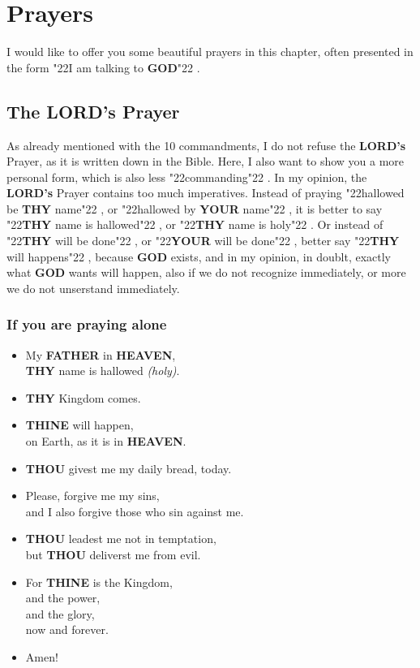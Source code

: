 \documentclass[12pt,a4paper]{article}
\newcommand{\God}[0]{\textbf{GOD}}
\newcommand{\Father}[0]{\textbf{FATHER}}
\newcommand{\Heaven}[0]{\textbf{HEAVEN}}
\newcommand{\Lords}[0]{\textbf{LORD's}}
\newcommand{\Thine}[0]{\textbf{THINE}}
\newcommand{\Thou}[0]{\textbf{THOU}}
\newcommand{\Thy}[0]{\textbf{THY}}
\newcommand{\Your}[0]{\textbf{YOUR}}
\newcommand{\q}[1]{\char"22{#1}\char"22 }
\begin{document}
		\newpage
		\section{Prayers}
			I would like to offer you some beautiful prayers in this chapter,
			often presented in the form \q{I am talking to {\God}}.
	
		\subsection{The {\Lords} Prayer}
			As already mentioned with the 10 commandments,
			I do not refuse the {\Lords} Prayer,
			as it is written down in the Bible.
			Here,
			I also want to show you a more personal form,
			which is also less \q{commanding}.
			In my opinion,
			the {\Lords} Prayer contains too much imperatives.
			Instead of praying \q{hallowed be {\Thy} name},
			or \q{hallowed by {\Your} name},
			it is better to say \q{{\Thy} name is hallowed},
			or \q{{\Thy} name is holy}.
			Or instead of \q{{\Thy} will be done},
			or \q{{\Your} will be done},
			better say \q{{\Thy} will happens},
			because {\God} exists,
			and in my opinion,
			in doublt,
			exactly what {\God} wants will happen,
			also if we do not recognize immediately,
			or more we do not unserstand immediately.
	
		\subsubsection{If you are praying alone}
			\begin{itemize}[nosep]
				\item	My {\Father} in {\Heaven},
						\\
						{\Thy} name is hallowed \textit{(holy)}.
				\item	{\Thy} Kingdom comes.
				\item	{{\Thine} will happen},
						\\
						on Earth,
						as it is in {\Heaven}.
				\item	{\Thou} givest me my daily bread,
						today.
				\item	Please,
						forgive me my sins,
						\\
						and I also forgive those who sin against me.
				\item	{\Thou} leadest me not in temptation,
						\\
						but {\Thou} deliverst me from evil.
				\item	For {\Thine} is the Kingdom,
						\\
						and the power,
						\\
						and the glory,
						\\
						now and forever.
				\item	Amen!
		\end{itemize}
		
\end{document}
